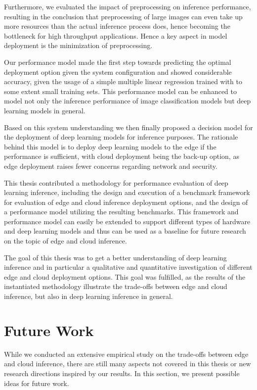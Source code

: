 Furthermore, we evaluated the impact of preprocessing on inference performance, resulting in the conclusion that preprocessing of large images can even take up more resources than the actual inference process does, hence becoming the bottleneck for high throughput applications.
Hence a key aspect in model deployment is the minimization of preprocessing.

Our performance model made the first step towards predicting the optimal deployment option given the system configuration and showed considerable accuracy, given the usage of a simple multiple linear regression trained with to some extent small training sets.
This performance model can be enhanced to model not only the inference performance of image classification models but deep learning models in general.

Based on this system understanding we then finally proposed a decision model for the deployment of deep learning models for inference purposes. The rationale behind this model is to deploy deep learning models to the edge if the performance is sufficient, with cloud deployment being the back-up option, as edge deployment raises fewer concerns regarding network and security.

This thesis contributed a methodology for performance evaluation of deep learning inference, including the design and execution of a benchmark framework for evaluation of edge and cloud inference deployment options, and the design of a performance model utilizing the resulting benchmarks.
This framework and performance model can easily be extended to support different types of hardware and deep learning models and thus can be used as a baseline for future research on the topic of edge and cloud inference.

The goal of this thesis was to get a better understanding of deep learning inference and in particular a qualitative and quantitative investigation of different edge and cloud deployment options.
This goal was fulfilled, as the results of the instantiated methodology illustrate the trade-offs between edge and cloud inference, but also in deep learning inference in general.



\section{Future Work}
While we conducted an extensive empirical study on the trade-offs between edge and cloud inference, there are still many aspects not covered in this thesis or new research directions inspired by our results. 
In this section, we present possible ideas for future work.

